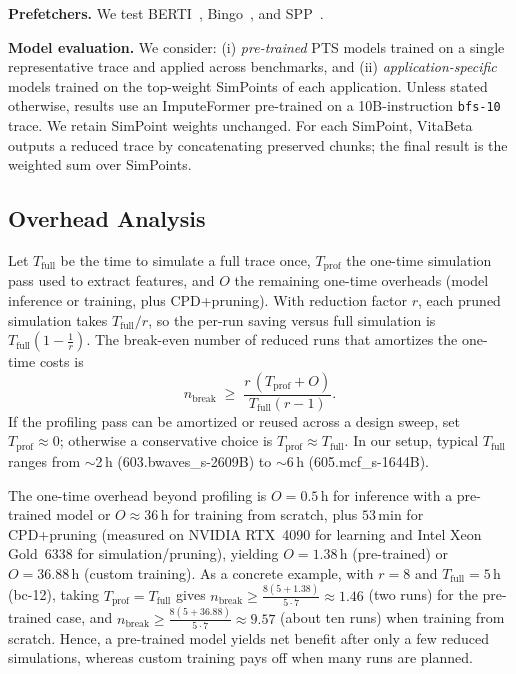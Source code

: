 \textbf{Prefetchers.} We test BERTI~\cite{navarro2022berti}, Bingo~\cite{bingo}, and SPP~\cite{spp}.

\textbf{Model evaluation.} 
We consider:
(i) \emph{pre-trained} PTS models trained on a single representative trace and applied across benchmarks, and
(ii) \emph{application-specific} models trained on the top-weight SimPoints of each application. Unless stated otherwise, results use an ImputeFormer pre-trained on a 10B-instruction \texttt{bfs-10} trace.
We retain SimPoint weights unchanged. For each SimPoint, VitaBeta outputs a reduced trace by concatenating preserved chunks; the final result is the weighted sum over SimPoints.

\subsection{Overhead Analysis}
\label{subsec:overhead}
Let $T_{\text{full}}$ be the time to simulate a full trace once, $T_{\text{prof}}$ the one-time simulation pass used to extract features, and $O$ the remaining one-time overheads (model inference or training, plus CPD+pruning). With reduction factor $r$, each pruned simulation takes $T_{\text{full}}/r$, so the per-run saving versus full simulation is $T_{\text{full}}\!\left(1-\frac{1}{r}\right)$. The break-even number of reduced runs that amortizes the one-time costs is
\begin{equation}
\label{eq:breakeven}
n_{\text{break}} \;\ge\; \frac{r\,(T_{\text{prof}} + O)}{T_{\text{full}}(r-1)}.
\end{equation}
If the profiling pass can be amortized or reused across a design sweep, set $T_{\text{prof}}\!\approx\!0$; otherwise a conservative choice is $T_{\text{prof}}\!\approx\!T_{\text{full}}$. In our setup, typical $T_{\text{full}}$ ranges from $\sim$2\,h (603.bwaves\_s-2609B) to $\sim$6\,h (605.mcf\_s-1644B). 

The one-time overhead beyond profiling is $O{=}0.5$\,h for inference with a pre-trained model or $O{\approx}36$\,h for training from scratch, plus $53$\,min for CPD+pruning (measured on NVIDIA RTX~4090 for learning and Intel Xeon Gold~6338 for simulation/pruning), yielding $O{=}1.38$\,h (pre-trained) or $O{=}36.88$\,h (custom training). As a concrete example, with $r{=}8$ and $T_{\text{full}}{=}5$\,h (bc-12), taking $T_{\text{prof}}{=}T_{\text{full}}$ gives
$n_{\text{break}} \!\ge\! \tfrac{8(5+1.38)}{5\cdot7}\!\approx\!1.46$ (two runs) for the pre-trained case, and
$n_{\text{break}} \!\ge\! \tfrac{8(5+36.88)}{5\cdot7}\!\approx\!9.57$ (about ten runs) when training from scratch. Hence, a pre-trained model yields net benefit after only a few reduced simulations, whereas custom training pays off when many runs are planned.


